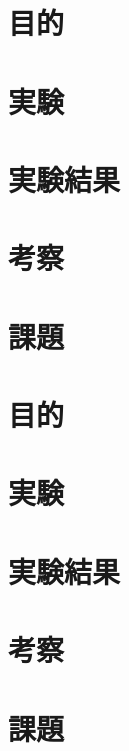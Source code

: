 \documentclass[uplatex, 11pt,a4j, titlepage]{jsarticle}
\begin{document}

\newpage


\subtitle{2020/10/16}

\section{目的}
\section{実験}
\section{実験結果}
\section{考察}
\section{課題}


\newpage



\subtitle{2019/*/*}

\section{目的}
\section{実験}
\section{実験結果}
\section{考察}
\section{課題}


\newpage
\thispagestyle{empty}
\nocite{Material}


\end{document}
